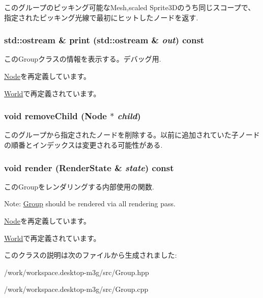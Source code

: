 このグループのピッキング可能なMesh,scaled Sprite3Dのうち同じスコープで、指定されたピッキング光線で最初にヒットしたノードを返す. \hypertarget{classm3g_1_1Group_6fea17fa1532df3794f8cb39cb4f911f}{
\subsubsection[{print}]{\setlength{\rightskip}{0pt plus 5cm}std::ostream \& print (std::ostream \& {\em out}) const}}
\label{classm3g_1_1Group_6fea17fa1532df3794f8cb39cb4f911f}


このGroupクラスの情報を表示する。デバッグ用. 

\hyperlink{classm3g_1_1Node_6fea17fa1532df3794f8cb39cb4f911f}{Node}を再定義しています。

\hyperlink{classm3g_1_1World_6fea17fa1532df3794f8cb39cb4f911f}{World}で再定義されています。\hypertarget{classm3g_1_1Group_7415646c6f397f080d198176df44395c}{
\subsubsection[{removeChild}]{\setlength{\rightskip}{0pt plus 5cm}void removeChild ({\bf Node} $\ast$ {\em child})}}
\label{classm3g_1_1Group_7415646c6f397f080d198176df44395c}


このグループから指定されたノードを削除する。以前に追加されていた子ノードの順番とインデックスは変更される可能性がある. \hypertarget{classm3g_1_1Group_8babc8a79b78615da51161e94029eea9}{
\subsubsection[{render}]{\setlength{\rightskip}{0pt plus 5cm}void render ({\bf RenderState} \& {\em state}) const}}
\label{classm3g_1_1Group_8babc8a79b78615da51161e94029eea9}


このGroupをレンダリングする内部使用の関数.

Note: \hyperlink{classm3g_1_1Group}{Group} should be rendered via all rendering pass. 

\hyperlink{classm3g_1_1Node_8babc8a79b78615da51161e94029eea9}{Node}を再定義しています。

\hyperlink{classm3g_1_1World_8babc8a79b78615da51161e94029eea9}{World}で再定義されています。

このクラスの説明は次のファイルから生成されました:\begin{CompactItemize}
\item 
/work/workspace.desktop-m3g/src/Group.hpp\item 
/work/workspace.desktop-m3g/src/Group.cpp\end{CompactItemize}
